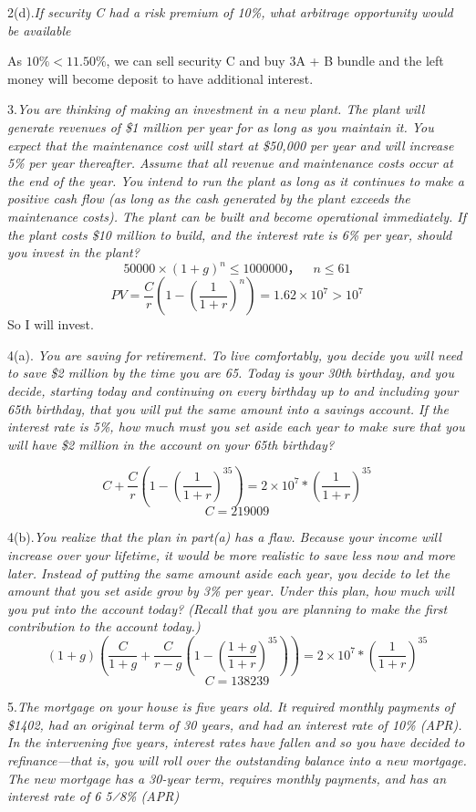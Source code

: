 \documentclass[10pt, a4paper]{article}
\begin{document}
2(d).\emph{If security C had a risk premium of 10\%, what arbitrage opportunity would be available}\

As $10\% < 11.50\%$, we can sell security C and buy 3A + B bundle and the left money will become deposit to have additional interest. 

\medskip


3.\emph{You are thinking of making an investment in a new plant. The plant will generate revenues of \$1 million per year for as long as you maintain it. You expect that the maintenance cost will start at \$50,000 per year and will increase 5\% per year thereafter. Assume that all revenue and maintenance costs occur at the end of the year. You intend to run the plant as long as it continues to make a positive cash flow (as long as the cash generated by the plant exceeds the maintenance costs). The plant can be built and become operational immediately. If the plant costs \$10 million to build, and the interest rate is 6\% per year, should you invest in the plant?}
$$50000 \times (1 + g) ^ n \leqslant 1000000，\quad n \leqslant 61$$
$$PV = \frac{C}{r}(1 - (\frac{1}{1 + r})^n) = 1.62 \times 10^7 > 10^7$$
So I will invest.
\medskip 

4(a). \emph{You are saving for retirement. To live comfortably, you decide you will need to save \$2 million by the time you are 65. Today is your 30th birthday, and you decide, starting today and continuing on every birthday up to and including your 65th birthday, that you will put the same amount into a savings account. If the interest rate is 5\%, how much must you set aside each year to make sure that you will have \$2 million in the account on your 65th birthday?}

$$C + \frac{C}{r}(1 - (\frac{1}{1 + r})^{35}) = 2\times 10^7 * (\frac{1}{1 + r})^{35}$$
$$C = 219009$$

4(b).\emph{You realize that the plan in part(a) has a flaw. Because your income will increase over your lifetime, it would be more realistic to save less now and more later. Instead of putting the same amount aside each year, you decide to let the amount that you set aside grow by 3\% per year. Under this plan, how much will you put into the account today? (Recall that you are planning to make the first contribution to the account today.)}
$$(1 + g)(\frac{C}{1 + g} + \frac{C}{r - g}(1 - (\frac{1 + g}{1 + r})^{35})) = 2 \times 10^7 * (\frac{1}{1 + r})^{35}$$
$$C = 138239$$
\medskip

5.\emph{The mortgage on your house is five years old. It required monthly payments of \$1402, had an original term of 30 years, and had an interest rate of 10\% (APR). In the intervening five years, interest rates have fallen and so you have decided to refinance—that is, you will roll over the outstanding balance into a new mortgage. The new mortgage has a 30-year term, requires monthly payments, and has an interest rate of 6 5⁄8\% (APR)}
\end{document}
